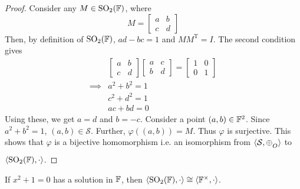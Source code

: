 \begin{proof}
    \noindent
    Consider any $M\in\mathrm{SO}_{2}(\mathbb{F})$, where
    \[ M = \begin{bmatrix}a & b \\ c & d\end{bmatrix} \]
    Then, by definition of $\mathrm{SO}_{2}(\mathbb{F})$, $ad-bc=1$ and
    $MM^\mathrm{T}=I$. The second condition gives
    \begin{align*}
        & \begin{bmatrix}a & b \\ c & d\end{bmatrix} \begin{bmatrix}a & c \\ b & d\end{bmatrix} = \begin{bmatrix}1 & 0 \\ 0 & 1\end{bmatrix} \\
        \implies& a^2 + b^2 = 1 \\
                & c^2 + d^2 = 1 \\
                & ac + bd = 0
    \end{align*}
    Using these, we get $a=d$ and $b=-c$. Consider a point $(a,b)\in\mathbb{F}^2$.
    Since $a^2+b^2=1$, $(a,b)\in\mathcal{S}$. Further, $\varphi((a,b))=M$.
    Thus $\varphi$ is surjective. This shows that $\varphi$ is a bijective
    homomorphism i.e. an isomorphism from $\langle \mathcal{S},\conop \rangle$ to
    $\langle \mathrm{SO}_{2}(\mathbb{F}),\cdot \rangle$.
\end{proof}

\begin{theorem} \label{thm:hyp_ell_corr}
    If $x^2+1=0$ has a solution in $\mathbb{F}$, then
    $\langle\mathrm{SO}_{2}(\mathbb{F}),\cdot\rangle \cong \langle\mathbb{F}^\times,\cdot\rangle$.
\end{theorem}

